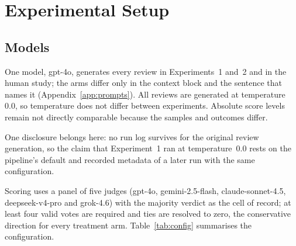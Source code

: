 \section{Experimental Setup}
\label{sec:setup}

\subsection{Models}

One model, gpt-4o, generates every review in Experiments~1 and~2 and in the
human study; the arms differ only in the context block and the sentence that
names it (Appendix~\ref{app:prompts}). All reviews are generated at
temperature~$0.0$, so temperature does not differ between experiments.
Absolute score levels remain not directly comparable because the samples
and outcomes differ.

One disclosure belongs here: no run log survives for the original review
generation, so the claim that Experiment~1 ran at temperature~$0.0$ rests on
the pipeline's default and recorded metadata of a later run with the same
configuration.

Scoring uses a panel of five judges (gpt-4o, gemini-2.5-flash,
claude-sonnet-4.5, deepseek-v4-pro and grok-4.6) with the majority verdict
as the cell of record; at least four valid votes are required and ties are
resolved to zero, the conservative direction for every treatment arm.
Table~\ref{tab:config} summarises the configuration.

